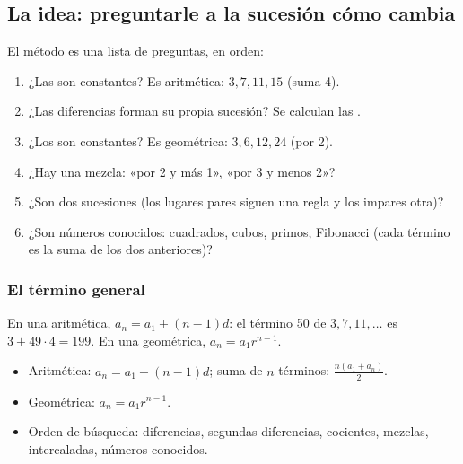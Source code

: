 

\subsection{La idea: preguntarle a la sucesión cómo cambia}
El método es una lista de preguntas, en orden:
\begin{enumerate}
  \item ¿Las  son constantes? Es aritmética: $3, 7, 11, 15$ (suma 4).
  \item ¿Las diferencias forman su propia sucesión? Se calculan las .
  \item ¿Los  son constantes? Es geométrica: $3, 6, 12, 24$ (por 2).
  \item ¿Hay una mezcla: «por 2 y más 1», «por 3 y menos 2»?
  \item ¿Son dos sucesiones  (los lugares pares siguen una regla y los impares otra)?
  \item ¿Son números conocidos: cuadrados, cubos, primos, Fibonacci (cada término es la suma de los dos anteriores)?
\end{enumerate}


\subsubsection{El término general}
En una aritmética, $a_n = a_1 + (n - 1)d$: el término 50 de $3, 7, 11, \ldots$ es $3 + 49 \cdot 4 = 199$. En una
geométrica, $a_n = a_1 r^{n-1}$.

\begin{regla}
\begin{itemize}
  \item Aritmética: $a_n = a_1 + (n - 1)d$; suma de $n$ términos: $\tfrac{n(a_1 + a_n)}{2}$.
  \item Geométrica: $a_n = a_1 r^{n - 1}$.
  \item Orden de búsqueda: diferencias, segundas diferencias, cocientes, mezclas, intercaladas, números conocidos.
\end{itemize}
\end{regla}

